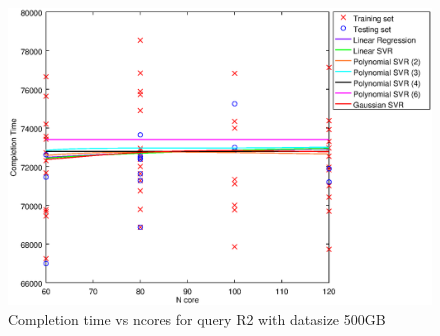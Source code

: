 
\begin {figure}[hbtp]
\centering
\includegraphics[width=\textwidth]{output/R2_500_1_OVER_NCORES/plot_R2_500.eps}
\caption{Completion time vs ncores for query R2 with datasize 500GB}
\label{fig:all_nonlinear_R2_500}
\end {figure}
